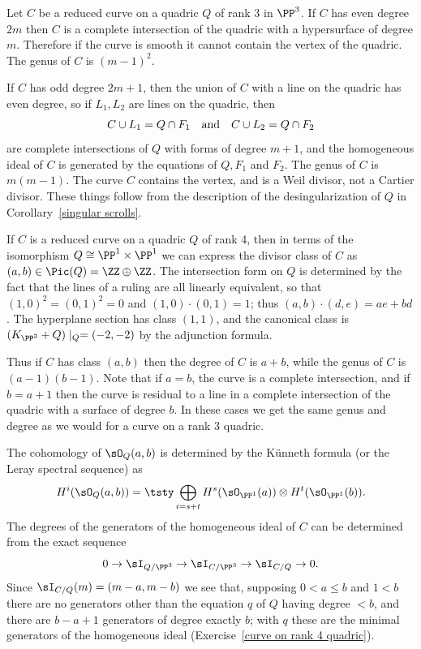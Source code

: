 \begin{example}\label{curve on rank 3 quadric}
Let $C$ be a reduced curve on a quadric $Q$ of rank 3 in $\PP^{3}$. 
If $C$ has even degree $2m$ then $C$ is a complete intersection
of the quadric with a hypersurface of degree $m$. Therefore if the curve is smooth it cannot contain the vertex of the quadric. The genus of $C$ is $(m-1)^{2}$.

If $C$ has odd degree $2m+1$, then the union of $C$ with a line on the quadric has even degree,
so if $L_{1}, L_{2}$ are lines on the quadric, then 
$$
C\cup L_{1} = Q\cap F_{1} \quad\hbox{and}\quad C\cup L_{2} = Q\cap F_{2}
$$
are complete intersections of $Q$ with forms of degree $m+1$, and the homogeneous ideal of $C$ is generated by the equations
of $Q,F_{1}$ and $F_{2}$. The genus of $C$ is $m(m-1)$. The curve $C$ contains the vertex, and is a 
%
%
Weil divisor, not a Cartier divisor. These things follow from the description of the desingularization
of $Q$ in Corollary~\ref{singular scrolls}.
\end{example}

\begin{example}
\label{curves on quadrics}
If $C$ is a reduced curve on a quadric $Q$ of rank 4, then in terms of the isomorphism
$Q \cong \PP^{1}\times \PP^{1}$ we can express the divisor class of $C$ as $(a,b)\in \Pic(Q) = \ZZ\oplus \ZZ$.
The intersection form on $Q$ is determined by the fact that the lines of a ruling are all linearly equivalent,
so that $(1,0)^{2} = (0,1)^2=0$ and $(1,0)\cdot (0,1) = 1$; thus $(a,b)\cdot (d,e) = ae+bd$. The hyperplane section
has class $(1,1)$, and the canonical class is $(K_{\PP^{3}}+Q)\mid_{Q} = (-2,-2)$ by the adjunction formula. 

Thus
if $C$ has class $(a,b)$ then the degree of $C$ is $a+b$, while the genus of $C$ is $(a-1)(b-1)$. Note that 
if  $a =b$, the curve is a complete intersection, and if $b = a+1$ then the curve is residual to
a line in a complete intersection of the quadric with a surface of degree $b$. In these cases we get the same genus and degree as we would for a curve
on a rank 3 quadric.


The cohomology of $\sO_{Q}(a,b)$ is determined by the K\"unneth formula
%
%
(or the Leray spectral sequence) as
$$
H^{i}(\sO_{Q}(a,b)) = \tsty\bigoplus\limits_{i = s+t}H^{s}
(\sO_{\PP^{1}}(a))\otimes H^{t}(\sO_{\PP^{1}}(b)).
$$
The degrees of the generators of the homogeneous ideal of $C$ can be determined from the exact sequence
$$
0\to \sI_{Q/\PP^{3}} \to \sI_{C/\PP^{3}} \to \sI_{C/Q} \to 0.
$$
Since $ \sI_{C/Q} (m) = (m-a,m-b)$ we see that, supposing $0<a\leq b$ and $1<b$
there are no generators other than the equation $q$ of $Q$ having degree $<b$, and there are 
$b-a+1$ generators of degree exactly $b$; with $q$ these are the minimal generators of the homogeneous
ideal (Exercise~\ref{curve on rank 4 quadric}).
\end{example}

